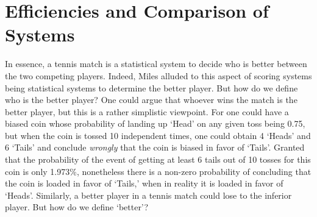 \documentclass[11pt]{article}
\theoremstyle{plain}
\theoremstyle{definition}
\newcommand{\RED}[1]{{\color{red} #1}}
\newcommand{\OLDPROOF}[1]{}
\begin{document}
\section{Efficiencies and Comparison of Systems}
\label{sec: efficiency and comparison}

\OLDPROOF{
\RED{maybe better to move the discussions of efficiency in a separate section (here).

Also,now thinking that maybe better efficiency measures are:

When there is one parameter, $p$, with $\theta(p)$, we could measure efficiency via, with respect to a prior $\pi(p)$:

$$Eff = \frac{\int_0^{1/2} (1/2 - \theta(p)) \pi(p) dp +
\int_{1/2}^1 (\theta(p)-1/2) \pi(p) dp}
{\int_0^{1/2} (1/2 - 0) \pi(p) dp +
\int_{1/2}^1 (1-1/2) \pi(p) dp}$$


while with two parameters $(p_A,p_B)$ with $\theta(p_A,p_B)$, to measure efficiency via:



$$Eff = \frac{\int_{p_A < p_B} (1/2 - \theta(p_A,p_B)) \pi(p_A,p_B) dp_A dp_B +
\int_{p_A>p_B} (\theta(p_A,p_B)-1/2) \pi(p_A,p_B) dp_A dp_B}
{\int_{p_A < p_B} (1/2 - 0) \pi(p_A,p_B) dp_A dp_B +
\int_{p_A>p_B} (1-1/2) \pi(p_A,p_B) dp_A dp_B}$$

In both cases, the ideal system will get a 100\% efficiency rating, while just a random system will get zero efficiency rating.

We could use the second measure to measure the efficiency of the set system and the match system.

Relative efficiency could then be measured as well by taking ratio.

We could compare the game system with Best-of-K systems.

We could compare the set and match systems relative to the STT system. We don't really have other systems to compare to, except Best-of-L systems.

}}





In essence, a tennis match is a statistical system to decide who is better between the two competing players. Indeed, Miles \cite{Miles1984} alluded to this aspect of scoring systems being statistical systems to determine the better player.  But how do we define who is the better player? One could argue that whoever wins the match is the better player, but this is a rather simplistic viewpoint. For one could have a biased coin whose probability of landing up `Head' on any given toss being 0.75, but when the coin is tossed 10 independent times, one could obtain 4 `Heads' and 6 `Tails' and conclude {\em wrongly} that the coin is biased in favor of `Tails'. Granted that the probability of the event of getting at least 6 tails out of 10 tosses for this coin is only 1.973\%, nonetheless there is a non-zero probability of concluding that the coin is loaded in favor of `Tails,' when in reality it is loaded in favor of `Heads'. Similarly, a better player in a tennis match could lose to the inferior player. But how do we define `better'?
\end{document}
